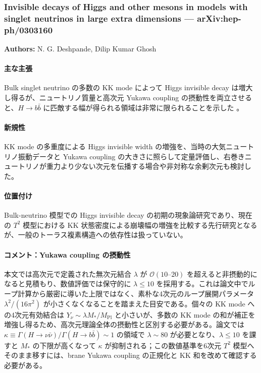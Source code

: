 \subsubsection{Invisible decays of Higgs and other mesons in models with singlet neutrinos in large extra dimensions --- arXiv:hep-ph/0303160}

\textbf{Authors:} N. G. Deshpande, Dilip Kumar Ghosh

\paragraph{主な主張}
Bulk singlet neutrino の多数の KK mode によって Higgs invisible decay は増大し得るが、ニュートリノ質量と高次元 Yukawa coupling の摂動性を両立させると、$H\to b\bar b$ に匹敵する幅が得られる領域は非常に限られることを示した \cite{Deshpande:2003Invisible}。

\paragraph{新規性}
KK mode の多重度による Higgs invisible width の増強を、当時の大気ニュートリノ振動データと Yukawa coupling の大きさに照らして定量評価し、右巻きニュートリノが重力より少ない次元を伝播する場合や非対称な余剰次元も検討した。

\paragraph{位置付け}
Bulk-neutrino 模型での Higgs invisible decay の初期の現象論研究であり、現在の $T^2$ 模型における KK 状態密度による崩壊幅の増強を比較する先行研究となるが、一般のトーラス複素構造への依存性は扱っていない。

\paragraph{コメント：Yukawa coupling の摂動性}
本文では高次元で定義された無次元結合 $\lambda$ が $\mathcal{O}(10\text{--}20)$ を超えると非摂動的になると見積もり、数値評価では保守的に $\lambda\leq 10$ を採用する。これは論文中でループ計算から厳密に導いた上限ではなく、素朴な4次元のループ展開パラメータ $\lambda^2/(16\pi^2)$ が小さくなくなることを踏まえた目安である。個々の KK mode への4次元有効結合は $Y_\nu\sim\lambda M_*/M_{\mathrm{Pl}}$ と小さいが、多数の KK mode の和が補正を増強し得るため、高次元理論全体の摂動性と区別する必要がある。論文では $\kappa\equiv\Gamma(H\to\nu\bar\nu)/\Gamma(H\to b\bar b)\sim 1$ の領域で $\lambda\sim80$ が必要となり、$\lambda\leq10$ を課すと $M_*$ の下限が高くなって $\kappa$ が抑制される；この数値基準を6次元 $T^2$ 模型へそのまま移すには、brane Yukawa coupling の正規化と KK 和を改めて確認する必要がある。
